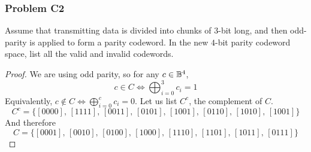 \documentclass[../../../main.tex]{subfiles}
\begin{document}
\subsubsection{Problem C2}
\begin{wts}
    Assume that transmitting data is divided into chunks of $3$-bit long, and then odd-parity is applied to form a parity codeword. In the new $4$-bit parity codeword space, list all the valid and invalid codewords.
\end{wts}
\begin{proof}
    We are using odd parity, so for any $c\in \mathbb{B}^4$,
    \[
    c\in C\iff \bigoplus_{i=0}^3 c_i =1
    \]
    Equivalently, $c\notin C\iff \bigoplus_{i=0}^c c_i =0$. Let us list $C^c$, the complement of $C$.
    \[
    C^c = \{[0000],\,[1111],\,[0011],\,[0101],\,[1001],\,[0110],\,[1010],\,[1001]\}
    \]
    And therefore
    \[
    C = \{[0001],\,[0010],\,[0100],\,[1000],\,[1110],\,[1101],\,[1011],\,[0111]\}
    \]
\end{proof}
\end{document}

